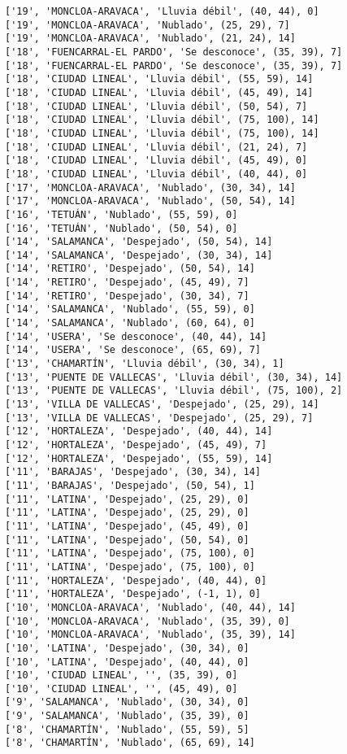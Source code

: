 \documentclass[11pt]{article}
\begin{document}
\begin{Verbatim}[commandchars=\\\{\}]
['19', 'MONCLOA-ARAVACA', 'Lluvia débil', (40, 44), 0]
['19', 'MONCLOA-ARAVACA', 'Nublado', (25, 29), 7]
['19', 'MONCLOA-ARAVACA', 'Nublado', (21, 24), 14]
['18', 'FUENCARRAL-EL PARDO', 'Se desconoce', (35, 39), 7]
['18', 'FUENCARRAL-EL PARDO', 'Se desconoce', (35, 39), 7]
['18', 'CIUDAD LINEAL', 'Lluvia débil', (55, 59), 14]
['18', 'CIUDAD LINEAL', 'Lluvia débil', (45, 49), 14]
['18', 'CIUDAD LINEAL', 'Lluvia débil', (50, 54), 7]
['18', 'CIUDAD LINEAL', 'Lluvia débil', (75, 100), 14]
['18', 'CIUDAD LINEAL', 'Lluvia débil', (75, 100), 14]
['18', 'CIUDAD LINEAL', 'Lluvia débil', (21, 24), 7]
['18', 'CIUDAD LINEAL', 'Lluvia débil', (45, 49), 0]
['18', 'CIUDAD LINEAL', 'Lluvia débil', (40, 44), 0]
['17', 'MONCLOA-ARAVACA', 'Nublado', (30, 34), 14]
['17', 'MONCLOA-ARAVACA', 'Nublado', (50, 54), 14]
['16', 'TETUÁN', 'Nublado', (55, 59), 0]
['16', 'TETUÁN', 'Nublado', (50, 54), 0]
['14', 'SALAMANCA', 'Despejado', (50, 54), 14]
['14', 'SALAMANCA', 'Despejado', (30, 34), 14]
['14', 'RETIRO', 'Despejado', (50, 54), 14]
['14', 'RETIRO', 'Despejado', (45, 49), 7]
['14', 'RETIRO', 'Despejado', (30, 34), 7]
['14', 'SALAMANCA', 'Nublado', (55, 59), 0]
['14', 'SALAMANCA', 'Nublado', (60, 64), 0]
['14', 'USERA', 'Se desconoce', (40, 44), 14]
['14', 'USERA', 'Se desconoce', (65, 69), 7]
['13', 'CHAMARTÍN', 'Lluvia débil', (30, 34), 1]
['13', 'PUENTE DE VALLECAS', 'Lluvia débil', (30, 34), 14]
['13', 'PUENTE DE VALLECAS', 'Lluvia débil', (75, 100), 2]
['13', 'VILLA DE VALLECAS', 'Despejado', (25, 29), 14]
['13', 'VILLA DE VALLECAS', 'Despejado', (25, 29), 7]
['12', 'HORTALEZA', 'Despejado', (40, 44), 14]
['12', 'HORTALEZA', 'Despejado', (45, 49), 7]
['12', 'HORTALEZA', 'Despejado', (55, 59), 14]
['11', 'BARAJAS', 'Despejado', (30, 34), 14]
['11', 'BARAJAS', 'Despejado', (50, 54), 1]
['11', 'LATINA', 'Despejado', (25, 29), 0]
['11', 'LATINA', 'Despejado', (25, 29), 0]
['11', 'LATINA', 'Despejado', (45, 49), 0]
['11', 'LATINA', 'Despejado', (50, 54), 0]
['11', 'LATINA', 'Despejado', (75, 100), 0]
['11', 'LATINA', 'Despejado', (75, 100), 0]
['11', 'HORTALEZA', 'Despejado', (40, 44), 0]
['11', 'HORTALEZA', 'Despejado', (-1, 1), 0]
['10', 'MONCLOA-ARAVACA', 'Nublado', (40, 44), 14]
['10', 'MONCLOA-ARAVACA', 'Nublado', (35, 39), 0]
['10', 'MONCLOA-ARAVACA', 'Nublado', (35, 39), 14]
['10', 'LATINA', 'Despejado', (30, 34), 0]
['10', 'LATINA', 'Despejado', (40, 44), 0]
['10', 'CIUDAD LINEAL', '', (35, 39), 0]
['10', 'CIUDAD LINEAL', '', (45, 49), 0]
['9', 'SALAMANCA', 'Nublado', (30, 34), 0]
['9', 'SALAMANCA', 'Nublado', (35, 39), 0]
['8', 'CHAMARTÍN', 'Nublado', (55, 59), 5]
['8', 'CHAMARTÍN', 'Nublado', (65, 69), 14]

\end{Verbatim}
\end{document}
